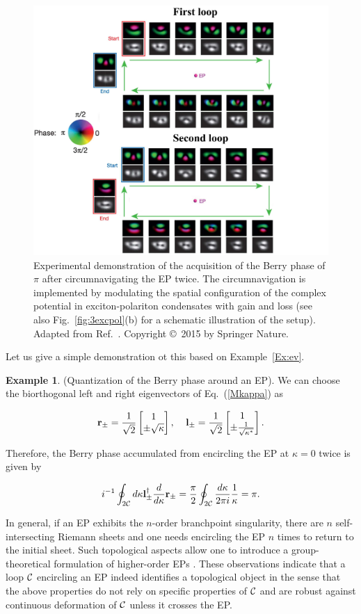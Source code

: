 \documentclass{tADP2e}
\theoremstyle{plain}
\newcommand{\eqn}[1]{
\begin{eqnarray}
	#1
\end{eqnarray}
}
\theoremstyle{plain}
\theoremstyle{definition}
\newtheorem{example}{Example}[section]
\newcommand{\exmp}[1]{
\begin{example}
	#1
\end{example}
}
\begin{document}
\begin{figure}
\begin{center}
\includegraphics[width=13cm]{./Figures/fig_2_ep_encircling.pdf}
\end{center}
\caption{  
Experimental demonstration of the acquisition of the Berry phase of $\pi$ after circumnavigating the EP twice.  The circumnavigation is implemented by modulating the spatial configuration of the complex potential in exciton-polariton condensates with gain and loss (see also Fig.~\ref{fig:3excpol}(b) for a schematic illustration of the setup).
Adapted from Ref.~\cite{GT15}. Copyright \copyright\,   2015 by Springer Nature.}
\label{fig:2encircle}
\end{figure}

Let us give a simple demonstration ot this based on Example~\ref{Ex:ev}.
\exmp{(Quantization of the Berry phase around an EP). We can choose the biorthogonal left and right eigenvectors of Eq.~(\ref{Mkappa}) as 
\eqn{
\bold{r}_\pm=\frac{1}{\sqrt{2}}\begin{bmatrix} 1 \\ \pm\sqrt{\kappa} \end{bmatrix},\;\;\;\;
\bold{l}_\pm=\frac{1}{\sqrt{2}}\begin{bmatrix} 1 \\ \pm\frac{1}{\sqrt{\kappa^*}} \end{bmatrix}.
}
Therefore, the Berry phase accumulated from encircling the EP at $\kappa=0$ twice is given by
\eqn{
i^{-1}\oint_{2\cal C}d\kappa\bold{l}_\pm^\dag\frac{d}{d\kappa}\bold{r}_\pm =\frac{\pi}{2} \oint_{2\cal C}\frac{d\kappa}{2\pi i}\frac{1}{\kappa}=\pi.
}
} 
In general, if an EP exhibits the $n$-order branchpoint singularity, there are $n$ self-intersecting Riemann sheets and one needs encircling the EP $n$ times to return to the initial sheet. Such topological aspects allow one to introduce a group-theoretical formulation of higher-order EPs \cite{RJW12,JH18,ZQ18}.
These observations indicate that a loop $\cal C$ encircling an EP indeed identifies a topological object in the sense that the above properties do not rely on specific properties of $\cal C$ and are robust against continuous deformation of $\cal C$ unless it crosses the EP.  
\end{document}
